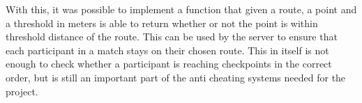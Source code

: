 With this, it was possible to implement a function that given a route, a point and a threshold in meters is able to return whether or not the point is within threshold distance of the route. This can be used by the server to ensure that each participant in a match stays on their chosen route. This in itself is not enough to check whether a participant is reaching checkpoints in the correct order, but is still an important part of the anti cheating systems needed for the project.